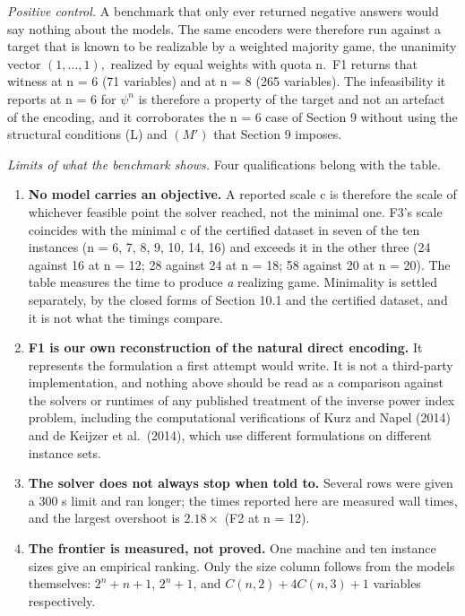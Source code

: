 \documentclass[
]{article}
\providecommand{\tightlist}{%
  \setlength{\itemsep}{0pt}\setlength{\parskip}{0pt}}
\begin{document}
\emph{Positive control.} A benchmark that only ever returned negative
answers would say nothing about the models. The same encoders were
therefore run against a target that is known to be realizable by a
weighted majority game, the unanimity vector \((1,\dots,1),\) realized
by equal weights with quota n.~F1 returns that witness at n = 6 (71
variables) and at n = 8 (265 variables). The infeasibility it reports at
n = 6 for \(\psi^n\) is therefore a property of the target and not an
artefact of the encoding, and it corroborates the n = 6 case of Section
9 without using the structural conditions (L) and \((M')\) that Section
9 imposes.

\emph{Limits of what the benchmark shows.} Four qualifications belong
with the table.

\begin{enumerate}
\def\labelenumi{\arabic{enumi}.}
\tightlist
\item
  \textbf{No model carries an objective.} A reported scale c is
  therefore the scale of whichever feasible point the solver reached,
  not the minimal one. F3's scale coincides with the minimal c of the
  certified dataset in seven of the ten instances (n = 6, 7, 8, 9, 10,
  14, 16) and exceeds it in the other three (24 against 16 at n = 12; 28
  against 24 at n = 18; 58 against 20 at n = 20). The table measures the
  time to produce \emph{a} realizing game. Minimality is settled
  separately, by the closed forms of Section 10.1 and the certified
  dataset, and it is not what the timings compare.
\item
  \textbf{F1 is our own reconstruction of the natural direct encoding.}
  It represents the formulation a first attempt would write. It is not a
  third-party implementation, and nothing above should be read as a
  comparison against the solvers or runtimes of any published treatment
  of the inverse power index problem, including the computational
  verifications of Kurz and Napel (2014) and de Keijzer et al.~(2014),
  which use different formulations on different instance sets.
\item
  \textbf{The solver does not always stop when told to.} Several rows
  were given a 300 s limit and ran longer; the times reported here are
  measured wall times, and the largest overshoot is \(2.18\times\) (F2
  at n = 12).
\item
  \textbf{The frontier is measured, not proved.} One machine and ten
  instance sizes give an empirical ranking. Only the size column follows
  from the models themselves: \(2^n+n+1\), \(2^n+1\), and
  \(C(n,2)+4C(n,3)+1\) variables respectively.
\end{enumerate}
\end{document}
